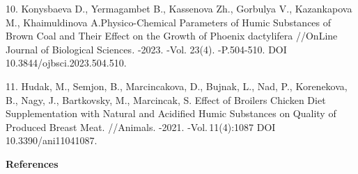 \begin{refs}
10. Konysbaeva D., Yermagambet B., Kassenova Zh., Gorbulya V.,
Kazankapova M., Khaimuldinova A.Physico-Chemical Parameters of Humic
Substances of Brown Coal and Their Effect on the Growth of Phoenix
dactylifera //OnLine Journal of Biological Sciences\emph{.} -2023. -Vol.
23(4). -P.504-510. DOI 10.3844/ojbsci.2023.504.510.

11. Hudak, M., Semjon, B., Marcincakova, D., Bujnak, L., Nad, P.,
Korenekova, B., Nagy, J., Bartkovsky, M., Marcincak, S. Effect of
Broilers Chicken Diet Supplementation with Natural and Acidified Humic
Substances on Quality of Produced Breast Meat. //Animals. -2021.
-Vol.\,11(4):1087 DOI 10.3390/ani11041087.
\end{refs}

\begin{center}
{\bfseries References}
\end{center}

